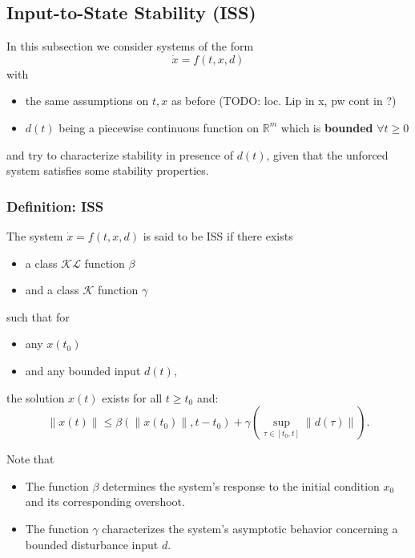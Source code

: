 \subsection{Input-to-State Stability (ISS)}
In this subsection we consider systems of the form
\noindent\begin{equation*}
    \dot{x} = f(t, x, d)
\end{equation*}
with
\begin{itemize}
    \item the same assumptions on $t,x$ as before (TODO: loc. Lip in x, pw cont in ?)
    \item $d(t)$ being a piecewise continuous function on $\mathbb{R}^m$ which is \textbf{bounded} $\forall t\geq 0$
\end{itemize}
and try to characterize stability in presence of $d(t)$, given that the unforced system satisfies some stability properties.

\subsubsection{Definition: ISS}
The system $\dot{x} = f(t, x, d)$ is said to be ISS if there exists
\begin{itemize}
    \item a class $\mathcal{K}\mathcal{L}$ function $\beta$
    \item and a class $\mathcal{K}$ function $\gamma$
\end{itemize}
such that for
\begin{itemize}
    \item any $x(t_0)$
    \item and any bounded input $d(t)$,
\end{itemize}
the solution $x(t)$ exists for all $t \geq t_0$ and:
\noindent\begin{equation*}
    \|x(t)\| \leq \beta(\|x(t_0)\|, t - t_0) + \gamma\left(\sup_{\tau \in [t_0, t]} \|d(\tau)\| \right).
\end{equation*}

\newpar{}

Note that
\begin{itemize}
    \item The function $\beta$ determines the system's response to the initial condition $x_0$ and its corresponding overshoot.
    \item The function $\gamma$ characterizes the system's asymptotic behavior concerning a bounded disturbance input $d$.
\end{itemize}

